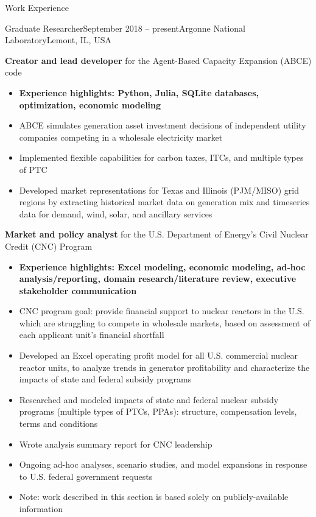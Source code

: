 \documentclass{resume} %
\begin{document}

\begin{rSection}{Work Experience}

\begin{rSubsection}{Graduate Researcher}{September 2018 -- present}{Argonne National Laboratory}{Lemont, IL, USA}
  \item \textbf{Creator and lead developer} for the Agent-Based Capacity Expansion (ABCE) code
    \begin{itemize}
      \setlength{\itemsep}{-3pt}
      \item \textbf{Experience highlights: Python, Julia, SQLite databases, optimization, economic modeling}
      \item ABCE simulates generation asset investment decisions of independent utility companies competing in a wholesale electricity market
      \item Implemented flexible capabilities for carbon taxes, ITCs, and multiple types of PTC
      \item Developed market representations for Texas and Illinois (PJM/MISO) grid regions by extracting historical market data on generation mix and timeseries data for demand, wind, solar, and ancillary services
    \end{itemize}

  \item \textbf{Market and policy analyst} for the U.S. Department of Energy's Civil Nuclear Credit (CNC) Program
  \begin{itemize}
    \setlength{\itemsep}{-3pt}
    \item \textbf{Experience highlights: Excel modeling, economic modeling, ad-hoc analysis/reporting, domain research/literature review, executive stakeholder communication}
    \item CNC program goal: provide financial support to nuclear reactors in the U.S. which are struggling to compete in wholesale markets, based on assessment of each applicant unit's financial shortfall
    \item Developed an Excel operating profit model for all U.S. commercial nuclear reactor units, to analyze trends in generator profitability and characterize the impacts of state and federal subsidy programs
    \item Researched and modeled impacts of state and federal nuclear subsidy programs (multiple types of PTCs, PPAs): structure, compensation levels, terms and conditions
    \item Wrote analysis summary report for CNC leadership
    \item Ongoing ad-hoc analyses, scenario studies, and model expansions in response to U.S. federal government requests
    \item Note: work described in this section is based solely on publicly-available information
  \end{itemize}


\end{rSubsection}
\end{rSection}
\end{document}
